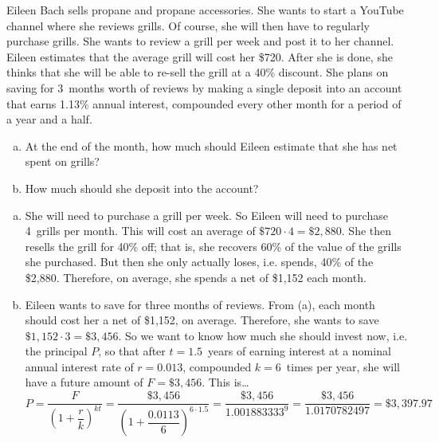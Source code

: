 \documentclass[11pt,letterpaper]{article}
\begin{document}

 Eileen Bach sells propane and propane accessories. She wants to start a YouTube channel where she reviews grills. Of course, she will then have to regularly purchase grills. She wants to review a grill per week and post it to her channel. Eileen estimates that the average grill will cost her \$720. After she is done, she thinks that she will be able to re-sell the grill at a 40\% discount. She plans on saving for 3~months worth of reviews by making a single deposit into an account that earns 1.13\% annual interest, compounded every other month for a period of a year and a half. 
	\begin{enumerate}[(a)]
	\item At the end of the month, how much should Eileen estimate that she has net spent on grills?
	\item How much should she deposit into the account? 
	\end{enumerate} \pspace

\sol 
\begin{enumerate}[(a)]
\item She will need to purchase a grill per week. So Eileen will need to purchase 4~grills per month. This will cost an average of $\$720 \cdot 4= \$2,\!880$. She then resells the grill for 40\% off; that is, she recovers 60\% of the value of the grills she purchased. But then she only actually loses, i.e. spends, 40\% of the \$2,880. Therefore, on average, she spends a net of \$1,152 each month. \pspace

\item Eileen wants to save for three months of reviews. From (a), each month should cost her a net of \$1,152, on average. Therefore, she wants to save $\$1,\!152 \cdot 3= \$3,\!456$. So we want to know how much she should invest now, i.e. the principal $P$, so that after $t= 1.5$~years of earning interest at a nominal annual interest rate of $r= 0.013$, compounded $k= 6$~times per year, she will have a future amount of $F= \$3,\!456$. This is\dots
	\[
	P= \dfrac{F}{\left(1 + \dfrac{r}{k} \right)^{kt}}= \dfrac{\$3,\!456}{\left(1 + \dfrac{0.0113}{6} \right)^{6 \cdot 1.5}}= \dfrac{\$3,\!456}{1.001883333^9}= \dfrac{\$3,\!456}{1.0170782497}= \$3,\!397.97
	\]
\end{enumerate}
\end{document}
